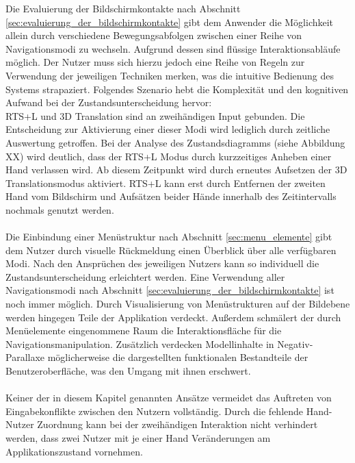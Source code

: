 Die Evaluierung der Bildschirmkontakte nach Abschnitt \ref{sec:evaluierung_der_bildschirmkontakte} gibt dem Anwender die Möglichkeit allein durch verschiedene Bewegungsabfolgen zwischen einer Reihe von Navigationsmodi zu wechseln. Aufgrund dessen sind flüssige Interaktionsabläufe möglich. Der Nutzer muss sich hierzu jedoch eine Reihe von Regeln zur Verwendung der jeweiligen Techniken merken, was die intuitive Bedienung des Systems strapaziert. Folgendes Szenario hebt die Komplexität und den kognitiven Aufwand bei der Zustandsunterscheidung hervor:
\\
RTS+L und 3D Translation sind an zweihändigen Input gebunden. Die Entscheidung zur Aktivierung einer dieser Modi wird lediglich durch zeitliche Auswertung getroffen. Bei der Analyse des Zustandsdiagramms (siehe Abbildung XX) wird deutlich, dass der RTS+L Modus durch kurzzeitiges Anheben einer Hand verlassen wird. Ab diesem Zeitpunkt wird durch erneutes Aufsetzen der 3D Translationsmodus aktiviert. RTS+L kann erst durch Entfernen der zweiten Hand vom Bildschirm und Aufsätzen beider Hände innerhalb des Zeitintervalls nochmals genutzt werden.
\\\\
Die Einbindung einer Menüstruktur nach Abschnitt \ref{sec:menu_elemente} gibt dem Nutzer durch visuelle Rückmeldung einen Überblick über alle verfügbaren Modi. Nach den Ansprüchen des jeweiligen Nutzers kann so individuell die Zustandsunterscheidung erleichtert werden. Eine Verwendung aller Navigationsmodi nach Abschnitt \ref{sec:evaluierung_der_bildschirmkontakte} ist noch immer möglich. Durch Visualisierung von Menüstrukturen auf der Bildebene werden hingegen Teile der Applikation verdeckt. Außerdem schmälert der durch Menüelemente eingenommene Raum die Interaktionsfläche für die Navigationsmanipulation. Zusätzlich verdecken Modellinhalte in Negativ-Parallaxe möglicherweise die dargestellten funktionalen Bestandteile der Benutzeroberfläche, was den Umgang mit ihnen erschwert. 
\\\\
Keiner der in diesem Kapitel genannten Ansätze vermeidet das Auftreten von Eingabekonflikte zwischen den Nutzern vollständig. Durch die fehlende Hand-Nutzer Zuordnung kann bei der zweihändigen Interaktion nicht verhindert werden, dass zwei Nutzer mit je einer Hand Veränderungen am Applikationszustand vornehmen.
